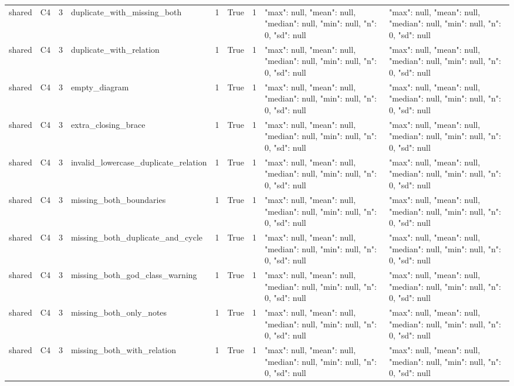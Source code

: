 \begin{tabular}{lllllllll}
shared & C4 & 3 & duplicate\_with\_missing\_both & 1 & True & 1 & {"max": null, "mean": null, "median": null, "min": null, "n": 0, "sd": null} & {"max": null, "mean": null, "median": null, "min": null, "n": 0, "sd": null} \\
shared & C4 & 3 & duplicate\_with\_relation & 1 & True & 1 & {"max": null, "mean": null, "median": null, "min": null, "n": 0, "sd": null} & {"max": null, "mean": null, "median": null, "min": null, "n": 0, "sd": null} \\
shared & C4 & 3 & empty\_diagram & 1 & True & 1 & {"max": null, "mean": null, "median": null, "min": null, "n": 0, "sd": null} & {"max": null, "mean": null, "median": null, "min": null, "n": 0, "sd": null} \\
shared & C4 & 3 & extra\_closing\_brace & 1 & True & 1 & {"max": null, "mean": null, "median": null, "min": null, "n": 0, "sd": null} & {"max": null, "mean": null, "median": null, "min": null, "n": 0, "sd": null} \\
shared & C4 & 3 & invalid\_lowercase\_duplicate\_relation & 1 & True & 1 & {"max": null, "mean": null, "median": null, "min": null, "n": 0, "sd": null} & {"max": null, "mean": null, "median": null, "min": null, "n": 0, "sd": null} \\
shared & C4 & 3 & missing\_both\_boundaries & 1 & True & 1 & {"max": null, "mean": null, "median": null, "min": null, "n": 0, "sd": null} & {"max": null, "mean": null, "median": null, "min": null, "n": 0, "sd": null} \\
shared & C4 & 3 & missing\_both\_duplicate\_and\_cycle & 1 & True & 1 & {"max": null, "mean": null, "median": null, "min": null, "n": 0, "sd": null} & {"max": null, "mean": null, "median": null, "min": null, "n": 0, "sd": null} \\
shared & C4 & 3 & missing\_both\_god\_class\_warning & 1 & True & 1 & {"max": null, "mean": null, "median": null, "min": null, "n": 0, "sd": null} & {"max": null, "mean": null, "median": null, "min": null, "n": 0, "sd": null} \\
shared & C4 & 3 & missing\_both\_only\_notes & 1 & True & 1 & {"max": null, "mean": null, "median": null, "min": null, "n": 0, "sd": null} & {"max": null, "mean": null, "median": null, "min": null, "n": 0, "sd": null} \\
shared & C4 & 3 & missing\_both\_with\_relation & 1 & True & 1 & {"max": null, "mean": null, "median": null, "min": null, "n": 0, "sd": null} & {"max": null, "mean": null, "median": null, "min": null, "n": 0, "sd": null} \\

\end{tabular}
